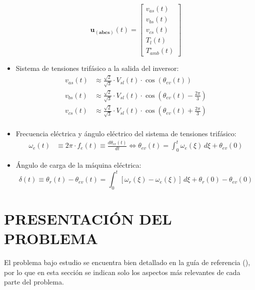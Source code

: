 \documentclass[a4paper, 10pt, onecolumn,journal]{ieeeconf}
\begin{document}
\begin{itemize}
\begin{equation}
        \mathbf{u_{(abcs)}}(t) = \begin{bmatrix} v_{as}(t) \\ v_{bs}(t) \\ v_{cs}(t)\\ T_l(t) \\ T_{amb}^{\circ}(t) \end{bmatrix}
        \label{vector de entradas}
    \end{equation}
    \item Sistema de tensiones trifásico a la salida del inversor:
    \begin{align}
        v_{as}(t) &\approx \frac{\sqrt{2}}{\sqrt{3}} \cdot V_{sl}(t) \cdot \cos(\theta_{ev}(t)) \\
        v_{bs}(t) &\approx \frac{\sqrt{2}}{\sqrt{3}} \cdot V_{sl}(t) \cdot \cos\left(\theta_{ev}(t) - \frac{2\pi}{3}\right) \\
        v_{cs}(t) &\approx \frac{\sqrt{2}}{\sqrt{3}} \cdot V_{sl}(t)\cdot \cos\left(\theta_{ev}(t) + \frac{2\pi}{3}\right)\\
        \label{sistema de tensiones trifásico real}
    \end{align}
    \item Frecuencia eléctrica y ángulo eléctrico del sistema de tensiones trifásico:
    \begin{align}
        \omega_e(t) &\equiv 2\pi \cdot f_e(t) \equiv \frac{d\theta_{ev}(t)}{dt} \iff \theta_{ev}(t) = \int_{0}^{t} \omega_e(\xi) \, d\xi + \theta_{ev}(0)
        \label{frecuencia eléctrica y ángulo eléctrico}
    \end{align}
    \item Ángulo de carga de la máquina eléctrica:
    \begin{equation}
        \delta(t) \equiv \theta_r(t) - \theta_{ev}(t) = \int_{0}^{t} [\omega_r(\xi) - \omega_e(\xi)] \, d\xi + \theta_r(0) - \theta_{ev}(0)
        \label{ángulo de carga}
    \end{equation}
\end{itemize}

\section{PRESENTACIÓN DEL PROBLEMA}
El problema bajo estudio se encuentra bien detallado en la guía de referencia (\cite{c1}), por lo que en esta sección se indican solo los aspectos más relevantes de cada parte del problema.
\end{document}
